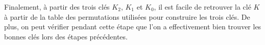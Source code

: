 Finalement, à partir des trois clés $K_2$, $K_1$ et $K_0$, il est facile de retrouver la clé $K$ à partir de la table des permutations utilisées pour construire les trois clés. De plus, on peut vérifier pendant cette étape que l'on a effectivement bien trouver les bonnes clés lors des étapes précédentes.




